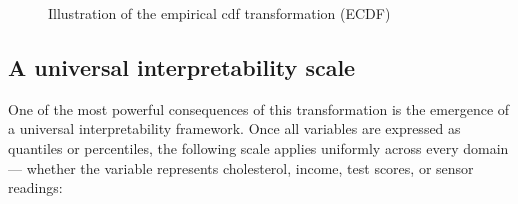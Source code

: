 \begin{figure}[!htpb]
\begin{center}
\end{center}
\caption{Illustration of the empirical cdf transformation (ECDF)}
\label{fig:empirical_cdf}
\end{figure}



\subsection*{A universal interpretability scale}
One of the most powerful consequences of this transformation is the emergence of a universal interpretability framework. Once all variables are expressed as quantiles or percentiles, the following scale applies uniformly across every domain — whether the variable represents cholesterol, income, test scores, or sensor readings:


